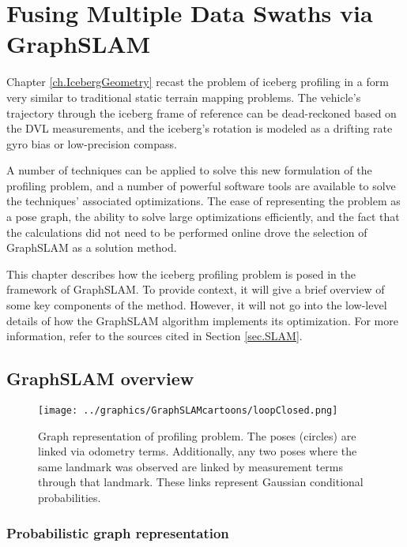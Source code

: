 
\chapter{Fusing Multiple Data Swaths via GraphSLAM}
\label{ch.GraphSLAM}

Chapter \ref{ch.IcebergGeometry} recast the problem of iceberg profiling in a form very similar to traditional static terrain mapping problems. The vehicle's trajectory through the iceberg frame of reference can be dead-reckoned based on the DVL measurements, and the iceberg's rotation is modeled as a drifting rate gyro bias or low-precision compass.

A number of techniques can be applied to solve this new formulation of the profiling problem, and a number of powerful software tools are available to solve the techniques' associated optimizations. The ease of representing the problem as a pose graph, the ability to solve large optimizations efficiently, and the fact that the calculations did not need to be performed online drove the selection of GraphSLAM as a solution method. 

This chapter describes how the iceberg profiling problem is posed in the framework of GraphSLAM. To provide context, it will give a brief overview of some key components of the method. However, it will not go into the low-level details of how the GraphSLAM algorithm implements its optimization. For more information, refer to the sources cited in Section \ref{sec.SLAM}.

\section{GraphSLAM overview}

\begin{figure}[htb]
   \centering
   \texttt{[image: ../graphics/GraphSLAMcartoons/loopClosed.png]} %
   \caption{Graph representation of profiling problem.  The poses (circles) are linked via odometry terms. Additionally, any two poses where the same landmark was observed are linked by measurement terms through that landmark. These links represent Gaussian conditional probabilities. }
   \label{fig:GraphSLAM}
\end{figure}

\subsection{Probabilistic graph representation}

